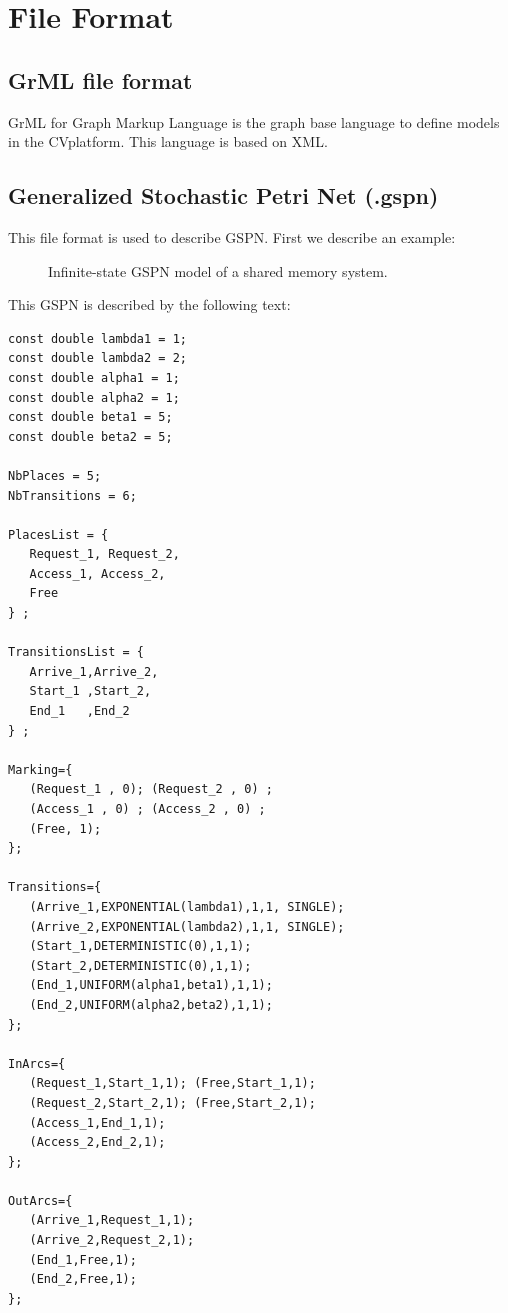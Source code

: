 \documentclass{article}
\newcommand{\cosyverif}{\mbox{\textup{C}\scalebox{0.75}{{\textsc{OSY}}}\textup{V}\scalebox{0.75}{{\textsc{ERIF}}}}}
\begin{document}
 

\section{File Format}
\label{sec:fileformat}

\subsection{GrML file format}
GrML for Graph Markup Language is the graph base language to define
models in the \cosyverif platform. This language is based on XML.


\subsection{Generalized Stochastic Petri Net (.gspn)}
This file format is used to describe GSPN.
First we describe an example:\\
\begin{figure}[h]
  \centering
  
  \caption{Infinite-state GSPN  model of a shared memory system.}
  \label{fig:sharedmem}
\end{figure}
This GSPN is described by the following text:

\begin{scriptsize}
\begin{verbatim}
const double lambda1 = 1;
const double lambda2 = 2;
const double alpha1 = 1;
const double alpha2 = 1;
const double beta1 = 5;
const double beta2 = 5;

NbPlaces = 5;
NbTransitions = 6;

PlacesList = { 
   Request_1, Request_2,
   Access_1, Access_2,
   Free
} ;

TransitionsList = { 
   Arrive_1,Arrive_2,
   Start_1 ,Start_2,
   End_1   ,End_2
} ;

Marking={
   (Request_1 , 0); (Request_2 , 0) ; 
   (Access_1 , 0) ; (Access_2 , 0) ;
   (Free, 1);
};

Transitions={
   (Arrive_1,EXPONENTIAL(lambda1),1,1, SINGLE); 
   (Arrive_2,EXPONENTIAL(lambda2),1,1, SINGLE);
   (Start_1,DETERMINISTIC(0),1,1); 
   (Start_2,DETERMINISTIC(0),1,1);
   (End_1,UNIFORM(alpha1,beta1),1,1); 
   (End_2,UNIFORM(alpha2,beta2),1,1);
};

InArcs={
   (Request_1,Start_1,1); (Free,Start_1,1);
   (Request_2,Start_2,1); (Free,Start_2,1);
   (Access_1,End_1,1);
   (Access_2,End_2,1);
};

OutArcs={
   (Arrive_1,Request_1,1); 
   (Arrive_2,Request_2,1);
   (End_1,Free,1);
   (End_2,Free,1);
};
\end{verbatim}
\end{scriptsize}
\end{document}
